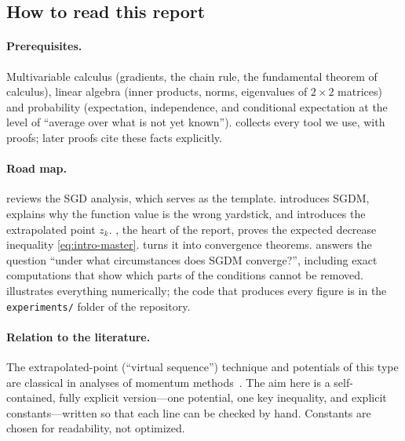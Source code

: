 \subsection{How to read this report}

\paragraph{Prerequisites.} Multivariable calculus (gradients, the chain rule, the
fundamental theorem of calculus), linear algebra (inner products, norms, eigenvalues of
$2\times2$ matrices) and probability (expectation, independence, and conditional
expectation at the level of ``average over what is not yet known''). 
collects every tool we use, with proofs; later proofs cite these facts explicitly.

\paragraph{Road map.}  reviews the SGD analysis, which serves as the
template.  introduces SGDM, explains why the function value is the
wrong yardstick, and introduces the extrapolated point $z_k$. , the heart
of the report, proves the expected decrease inequality \eqref{eq:intro-master}.
 turns it into convergence theorems. 
answers the question ``under what circumstances does SGDM converge?'', including exact
computations that show which parts of the conditions cannot be removed.
 illustrates everything numerically; the code that produces every
figure is in the \texttt{experiments/} folder of the repository.

\paragraph{Relation to the literature.} The extrapolated-point (``virtual sequence'')
technique and potentials of this type are classical in analyses of momentum
methods~\cite{ghadimi2015,yang2016,yu2019,liu2020,sebbouh2021}. The aim here is a
self-contained, fully explicit version---one potential, one key inequality, and explicit
constants---written so that each line can be checked by hand. Constants are chosen for
readability, not optimized.
